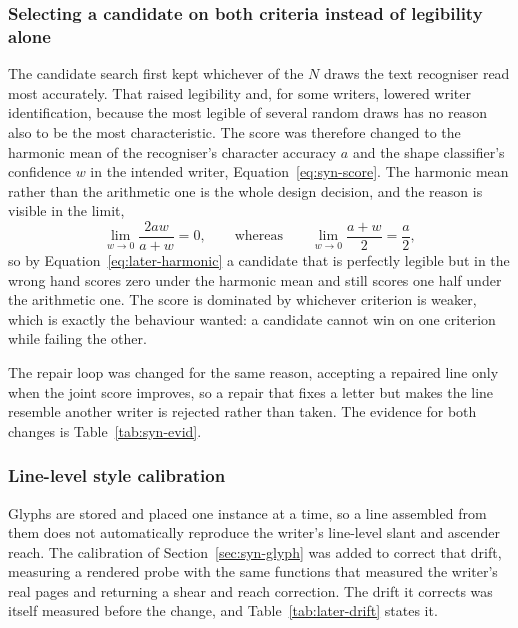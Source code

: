 \subsubsection{Selecting a candidate on both criteria instead of legibility alone}
\label{sec:later-joint}

The candidate search first kept whichever of the $N$ draws the text recogniser read most accurately. That raised legibility and, for some writers, lowered writer identification, because the most legible of several random draws has no reason also to be the most characteristic. The score was therefore changed to the harmonic mean of the recogniser's character accuracy $a$ and the shape classifier's confidence $w$ in the intended writer, Equation~\ref{eq:syn-score}. The harmonic mean rather than the arithmetic one is the whole design decision, and the reason is visible in the limit,
\begin{equation}
\lim_{w\to0}\frac{2aw}{a+w}=0,\qquad\text{whereas}\qquad\lim_{w\to0}\frac{a+w}{2}=\frac a2,
\label{eq:later-harmonic}
\end{equation}
so by Equation~\ref{eq:later-harmonic} a candidate that is perfectly legible but in the wrong hand scores zero under the harmonic mean and still scores one half under the arithmetic one. The score is dominated by whichever criterion is weaker, which is exactly the behaviour wanted: a candidate cannot win on one criterion while failing the other.

The repair loop was changed for the same reason, accepting a repaired line only when the joint score improves, so a repair that fixes a letter but makes the line resemble another writer is rejected rather than taken. The evidence for both changes is Table~\ref{tab:syn-evid}.

\subsubsection{Line-level style calibration}
\label{sec:later-cal}

Glyphs are stored and placed one instance at a time, so a line assembled from them does not automatically reproduce the writer's line-level slant and ascender reach. The calibration of Section~\ref{sec:syn-glyph} was added to correct that drift, measuring a rendered probe with the same functions that measured the writer's real pages and returning a shear and reach correction. The drift it corrects was itself measured before the change, and Table~\ref{tab:later-drift} states it.

